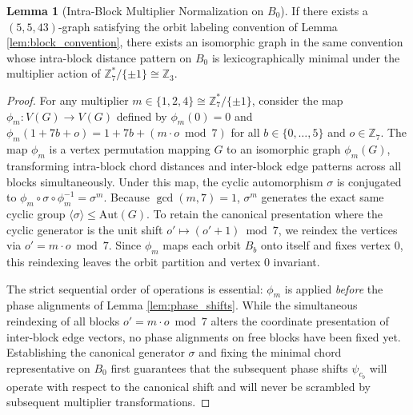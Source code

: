 \documentclass[11pt,a4paper]{article}
\theoremstyle{definition}
\newtheorem{lemma}{Lemma}
\begin{document}
\begin{lemma}[Intra-Block Multiplier Normalization on $B_0$]
\label{lem:multiplier}
If there exists a $(5,5,43)$-graph satisfying the orbit labeling convention of Lemma \ref{lem:block_convention}, there exists an isomorphic graph in the same convention whose intra-block distance pattern on $B_0$ is lexicographically minimal under the multiplier action of $\mathbb{Z}_7^* / \{\pm 1\} \cong \mathbb{Z}_3$.
\end{lemma}
\begin{proof}
For any multiplier $m \in \{1, 2, 4\} \cong \mathbb{Z}_7^* / \{\pm 1\}$, consider the map $\phi_m: V(G) \to V(G)$ defined by $\phi_m(0) = 0$ and $\phi_m(1 + 7b + o) = 1 + 7b + (m \cdot o \bmod 7)$ for all $b \in \{0, \dots, 5\}$ and $o \in \mathbb{Z}_7$.
The map $\phi_m$ is a vertex permutation mapping $G$ to an isomorphic graph $\phi_m(G)$, transforming intra-block chord distances and inter-block edge patterns across all blocks simultaneously. 
Under this map, the cyclic automorphism $\sigma$ is conjugated to $\phi_m \circ \sigma \circ \phi_m^{-1} = \sigma^m$. Because $\gcd(m, 7) = 1$, $\sigma^m$ generates the exact same cyclic group $\langle \sigma \rangle \le \text{Aut}(G)$. To retain the canonical presentation where the cyclic generator is the unit shift $o' \mapsto (o' + 1) \bmod 7$, we reindex the vertices via $o' = m \cdot o \bmod 7$. Since $\phi_m$ maps each orbit $B_b$ onto itself and fixes vertex 0, this reindexing leaves the orbit partition and vertex 0 invariant.

The strict sequential order of operations is essential: $\phi_m$ is applied \emph{before} the phase alignments of Lemma \ref{lem:phase_shifts}. While the simultaneous reindexing of all blocks $o' = m \cdot o \bmod 7$ alters the coordinate presentation of inter-block edge vectors, no phase alignments on free blocks have been fixed yet. Establishing the canonical generator $\sigma$ and fixing the minimal chord representative on $B_0$ first guarantees that the subsequent phase shifts $\psi_{c_b}$ will operate with respect to the canonical shift and will never be scrambled by subsequent multiplier transformations.


\end{proof}
\end{document}
